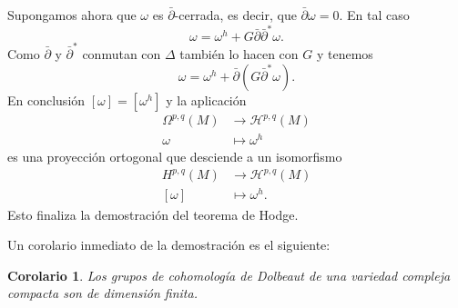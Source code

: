 \documentclass[12pt,a4paper]{article}
\newtheorem{corol}[thm]{Corolario}
\theoremstyle{definition} \newtheorem{defn}[thm]{Definición}
\theoremstyle{definition} \newtheorem{ejemplo}[thm]{Ejemplo}
\theoremstyle{definition} \newtheorem{ejercicio}[thm]{Ejercicio}
\theoremstyle{remark} \newtheorem*{obs}{Observación}
\newcommand{\dol}{\bar{\partial}}
\begin{document}
    Supongamos ahora que $\omega$ es $\dol$-cerrada, es decir, que $\dol \omega=0$. En tal caso
    \begin{equation*}
      \omega=\omega^h + G\dol \dol^* \omega.
    \end{equation*}
    Como $\dol$ y $\dol^*$ conmutan con $\Delta$ también lo hacen con $G$ y tenemos
    \begin{equation*}
      \omega= \omega^h + \dol(G\dol^*\omega).
    \end{equation*}
    En conclusión $[\omega]=[\omega^h]$ y la aplicación
    \begin{align*}
      \Omega^{p,q}(M)&\longrightarrow \mathcal{H}^{p,q}(M)\\ 
        \omega &\longmapsto \omega^h 
      \end{align*}
      es una proyección ortogonal que desciende a un isomorfismo
      \begin{align*}
	H^{p,q}(M)&\longrightarrow \mathcal{H}^{p,q}(M)\\ 
      [\omega] &\longmapsto \omega^h .
	\end{align*}
	Esto finaliza la demostración del teorema de Hodge.

	Un corolario inmediato de la demostración es el siguiente:
	\begin{corol}
	  Los grupos de cohomología de Dolbeaut de una variedad compleja compacta son de dimensión finita.
	\end{corol}
\end{document}
